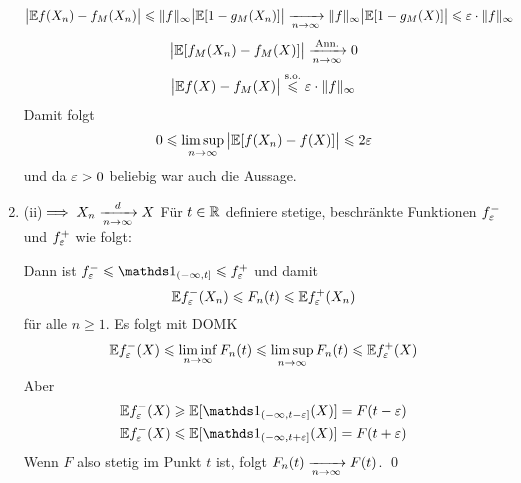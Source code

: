 \documentclass[11pt]{report}
\begin{document}
\begin{enumerate}[label=\Roman*. ]
    \begin{align*}
        \big|\E f(X_n)-f_M(X_n)\big|&\leq\Vert f\Vert_\infty\big|\E[1-g_M(X_n)]\big|\nto{}{n\to\infty}\Vert f\Vert_\infty\big|\E[1-g_M(X)]\big|\leq\eps\cdot\Vert f\Vert_\infty
    \end{align*}
    \begin{align*}
        \big|\E [f_M(X_n)-f_M(X)]\big|\nto{\text{Ann.}}{n\to\infty}0
    \end{align*}
    \begin{align*}
        \big|\mathbb{E} f(X)-f_M(X)\big|\overset{\text{s.o.}}{\leqslant}\varepsilon \cdot\Vert f\Vert_\infty
    \end{align*}
    Damit folgt
    $$0\leqslant\limsup_{n\to\infty}\big|\mathbb{E}[f(X_n)-f(X)]\big|\leqslant2\varepsilon$$
    und da $\varepsilon>0$ beliebig war auch die Aussage.

    \item (ii)$\implies X_n\nto{d}{n\to\infty}X$\newline
    F\"ur $t\in\mathbb{R}$ definiere stetige, beschr\"ankte Funktionen $f_\varepsilon^-$ und $f_\varepsilon^+$ wie folgt: \newline \newline
    \newline      
    Dann ist $f_\eps^-\leq\ind{(-\infty,t]}\leq f_\eps^+$ und damit 
    $$\mathbb{E} f_\varepsilon^-(X_n)\leqslant F_n(t)\leqslant \mathbb{E} f_\varepsilon^+(X_n)$$
    f\"ur alle $n\geq1$. Es folgt mit DOMK 
    $$\mathbb{E} f_\varepsilon^-(X)\leqslant \liminf_{n\to\infty}F_n(t)\leqslant \limsup_{n\to\infty}F_n(t)\leqslant \mathbb{E} f_\varepsilon^+(X)$$
    Aber 
    \begin{align*}
        &\E f_\eps^-(X)\geq\E[\ind{(-\infty,t-\eps]}(X)]=F(t-\eps) \\
        &\E f_\eps^-(X)\leq\E[\ind{(-\infty,t+\eps]}(X)]=F(t+\eps)
    \end{align*}
    Wenn $F$ also stetig im Punkt $t$ ist, folgt $F_n(t)\nto{}{n\to\infty}F(t)$. \qed
\end{enumerate}
\end{document}
